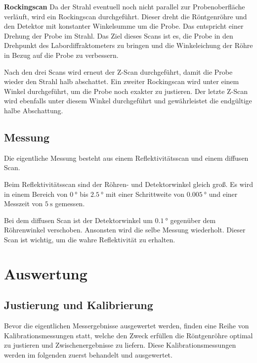 \textbf{Rockingscan}
\newline
Da der Strahl eventuell noch nicht parallel zur Probenoberfläche verläuft, wird ein Rockingscan durchgeführt. Dieser dreht die Röntgenröhre und den Detektor mit konstanter Winkelsumme um die Probe. Das entspricht einer Drehung der Probe im Strahl. Das Ziel dieses Scans ist es, die Probe in den Drehpunkt des Labordiffraktometers zu bringen und die Winkeleichung der Röhre in Bezug auf die Probe zu verbessern.

Nach den drei Scans wird erneut der Z-Scan durchgeführt, damit die Probe wieder den Strahl halb abschattet.
Ein zweiter Rockingscan wird unter einem Winkel durchgeführt, um die Probe noch exakter zu justieren.
Der letzte Z-Scan wird ebenfalls unter diesem Winkel durchgeführt und gewährleistet die endgültige halbe Abschattung. %



\subsection{Messung}
Die eigentliche Messung besteht aus einem Reflektivitätsscan und einem diffusen Scan.

Beim Reflektivitätsscan sind der Röhren- und Detektorwinkel gleich groß. Es wird in einem Bereich von $\SI{0}{\degree}$ bis $\SI{2.5}{\degree}$ mit einer Schrittweite von $\SI{0.005}{\degree}$ und einer Messzeit von $\SI{5}{\second}$ gemessen.

Bei dem diffusen Scan ist der Detektorwinkel um $\SI{0.1}{\degree}$ gegenüber dem Röhrenwinkel verschoben. Ansonsten wird die selbe Messung wiederholt. Dieser Scan ist wichtig, um die wahre Reflektivität zu erhalten. %


\section{Auswertung}
\subsection{Justierung und Kalibrierung}
Bevor die eigentlichen Messergebnisse ausgewertet werden, finden eine Reihe von Kalibrationsmessungen statt,
welche den Zweck erfüllen die Röntgenröhre optimal zu justieren und Zwischenergebnisse zu liefern.
Diese Kalibrationsmessungen werden im folgenden zuerst behandelt und ausgewertet.

